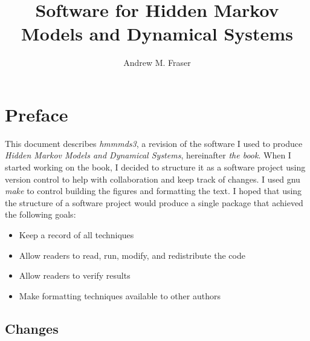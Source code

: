 \documentclass[prelim,showlabels]{book}
\author{Andrew M. Fraser}
\title{Software for Hidden Markov Models and Dynamical Systems}
\begin{document}
\frontmatter
\maketitle

\chapter{Preface}
\label{chap:preface}

This document describes \emph{hmmmds3}, a revision of the software I
used to produce \emph{Hidden Markov Models and Dynamical Systems},
hereinafter \emph{the book}.  When I started working on the book, I
decided to structure it as a software project using version control to
help with collaboration and keep track of changes.  I used gnu
\emph{make} to control building the figures and formatting the text.
I hoped that using the structure of a software project would produce a
single package that achieved the following goals:
\begin{itemize}
\item Keep a record of all techniques
\item Allow readers to read, run, modify, and redistribute the code
\item Allow readers to verify results
\item Make formatting techniques available to other authors
\end{itemize}

\section*{Changes}
\label{sec:changes}
\end{document}
